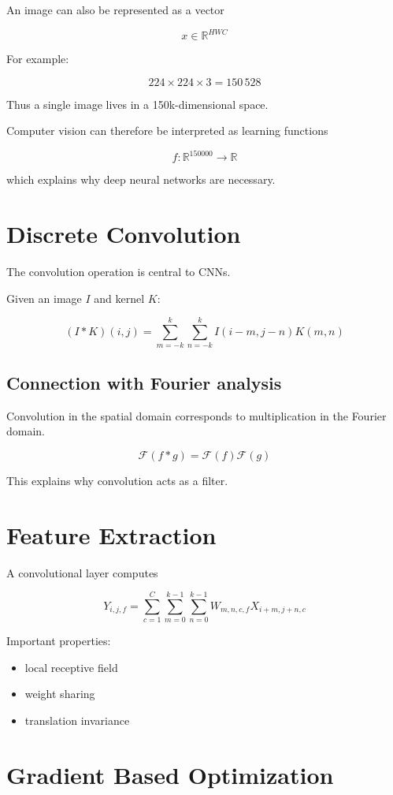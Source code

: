 ﻿\documentclass[11pt]{article}
\begin{document}
An image can also be represented as a vector

\[
x \in \mathbb{R}^{HWC}
\]

For example:

\[
224 \times 224 \times 3 = 150\,528
\]

Thus a single image lives in a
150k-dimensional space.

Computer vision can therefore be interpreted
as learning functions

\[
f : \mathbb{R}^{150000} \rightarrow \mathbb{R}
\]

which explains why deep neural networks are necessary.

\section{Discrete Convolution}

The convolution operation is central to CNNs.

Given an image $I$ and kernel $K$:

\[
(I*K)(i,j) =
\sum_{m=-k}^{k}
\sum_{n=-k}^{k}
I(i-m,j-n)K(m,n)
\]

\subsection{Connection with Fourier analysis}

Convolution in the spatial domain corresponds
to multiplication in the Fourier domain.

\[
\mathcal{F}(f * g) =
\mathcal{F}(f)\mathcal{F}(g)
\]

This explains why convolution acts as a filter.

\section{Feature Extraction}

A convolutional layer computes

\[
Y_{i,j,f} =
\sum_{c=1}^{C}
\sum_{m=0}^{k-1}
\sum_{n=0}^{k-1}
W_{m,n,c,f}X_{i+m,j+n,c}
\]

Important properties:

\begin{itemize}
\item local receptive field
\item weight sharing
\item translation invariance
\end{itemize}

\section{Gradient Based Optimization}
\end{document}
